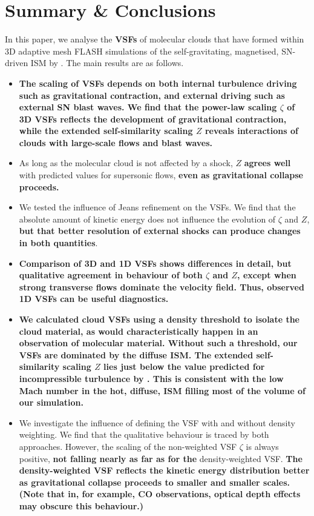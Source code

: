 \section{Summary \& Conclusions}\label{conclusions}

In this paper, we analyse the \textbf{VSFs} of molecular clouds that have formed within 3D adaptive mesh FLASH simulations of the self-gravitating, magnetised, SN-driven ISM by .
The main results are as follows.

\begin{itemize}
\item \textbf{The scaling of VSFs depends on both internal turbulence driving such as gravitational contraction, and external driving such as external SN blast waves. We find that the power-law scaling $\zeta$ of 3D VSFs reflects the development of gravitational contraction, while the extended self-similarity scaling $Z$ reveals interactions of clouds with large-scale flows and blast waves.}
\item As long as the molecular cloud is not affected by a shock, $Z$ \textbf{agrees well} with predicted values for supersonic flows, \textbf{even as gravitational collapse proceeds.}
\item We tested the influence of Jeans refinement on the VSFs. We find that the absolute amount of kinetic energy does not influence the evolution of $\zeta$ and $Z$, \textbf{but that better resolution of external shocks can produce changes in both quantities}.
\item \textbf{Comparison of 3D and 1D VSFs shows differences in detail, but qualitative agreement in behaviour of both $\zeta$ and $Z$, except when strong transverse flows dominate the velocity field. Thus, observed 1D VSFs can be useful diagnostics. }
\item \textbf{We calculated cloud VSFs using a density threshold to isolate the cloud material, as would characteristically happen in an observation of molecular material. Without such a threshold, our VSFs are dominated by the diffuse ISM. The extended self-similarity scaling $Z$ lies just below the value predicted for incompressible turbulence by \citet{She1994}. This is consistent with the low Mach number in the hot, diffuse, ISM filling most of the volume of our simulation.}
\item We investigate the influence of defining the VSF with and without density weighting. We find that the qualitative behaviour is traced by both approaches. However, the scaling of the non-weighted VSF $\zeta$ is always positive, \textbf{not falling nearly as far as for the} density-weighted VSF. \textbf{The density-weighted VSF reflects the kinetic energy distribution better as gravitational collapse proceeds to smaller and smaller scales. (Note that in, for example, CO observations, optical depth effects may obscure this behaviour.) }

\end{itemize}
